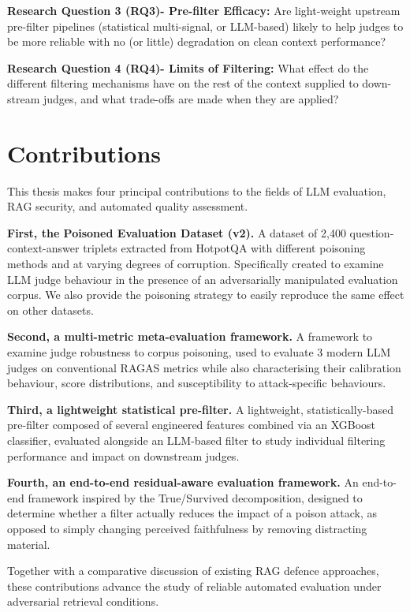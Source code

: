 \textbf{Research Question 3 (RQ3)- Pre-filter Efficacy:} Are light-weight upstream pre-filter pipelines (statistical multi-signal, or LLM-based) likely to help judges to be more reliable with no (or little) degradation on clean context performance?

\textbf{Research Question 4 (RQ4)- Limits of Filtering:} What effect do the different filtering mechanisms have on the rest of the context supplied to down-stream judges, and what trade-offs are made when they are applied?

\section{Contributions}

This thesis makes four principal contributions to the fields of LLM evaluation, RAG security, and automated quality assessment.

\textbf{First, the Poisoned Evaluation Dataset (v2).} A dataset of 2,400 question-context-answer triplets extracted from HotpotQA with different poisoning methods and at varying degrees of corruption. Specifically created to examine LLM judge behaviour in the presence of an adversarially manipulated evaluation corpus. We also provide the poisoning strategy to easily reproduce the same effect on other datasets.

\textbf{Second, a multi-metric meta-evaluation framework.} A framework to examine judge robustness to corpus poisoning, used to evaluate 3 modern LLM judges on conventional RAGAS metrics while also characterising their calibration behaviour, score distributions, and susceptibility to attack-specific behaviours.

\textbf{Third, a lightweight statistical pre-filter.} A lightweight, statistically-based pre-filter composed of several engineered features combined via an XGBoost classifier, evaluated alongside an LLM-based filter to study individual filtering performance and impact on downstream judges.

\textbf{Fourth, an end-to-end residual-aware evaluation framework.} An end-to-end framework inspired by the True/Survived decomposition, designed to determine whether a filter actually reduces the impact of a poison attack, as opposed to simply changing perceived faithfulness by removing distracting material.

Together with a comparative discussion of existing RAG defence approaches, these contributions advance the study of reliable automated evaluation under adversarial retrieval conditions.

